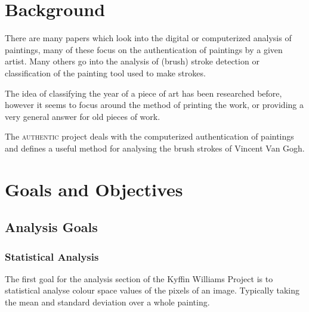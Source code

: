 \documentclass[11pt,fleqn,twoside]{article}
\begin{document}
\section{Background}
There are many papers which look into the digital or computerized analysis of paintings, many of 
these focus on the authentication of paintings by a given artist. Many others go into the analysis
of (brush) stroke detection or classification of the painting tool used to make strokes.

The idea of classifying the year of a piece of art has been researched before, however it seems to
focus around the method of printing the work, or providing a very general answer for old pieces of
work.

The \textsc{authentic} project\cite{citeulike:11446581} deals with the computerized authentication
of paintings and defines a useful method for analysing the brush strokes of Vincent Van Gogh.



\section{Goals and Objectives}

\subsection{Analysis Goals}

\subsubsection{Statistical Analysis}
The first goal for the analysis section of the Kyffin Williams Project is to statistical analyse
colour space values of the pixels of an image. Typically taking the mean and standard deviation
over a whole painting.
\end{document}
